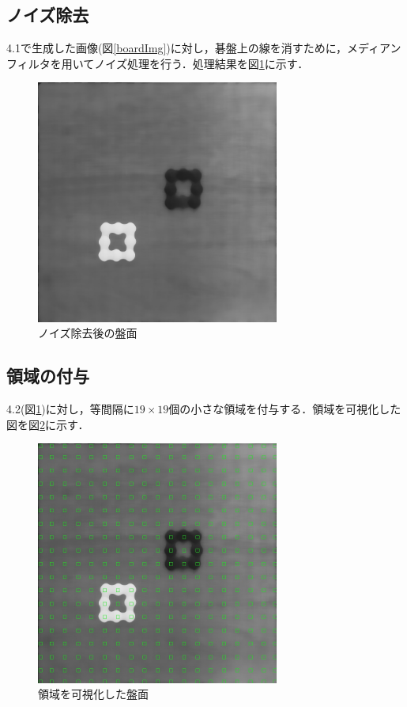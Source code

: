 \documentclass[openright]{nitocs}
\numberwithin{equation}{section}
\begin{document}
        \subsection{ノイズ除去}
            4.1で生成した画像(図\ref{boardImg})に対し，碁盤上の線を消すために，メディアンフィルタを用いてノイズ処理を行う．処理結果を図\ref{noiseReduced}に示す．
            \begin{figure}[tb] %
                \begin{center}
                \includegraphics[clip,width=80mm]{noiseReducedImg.jpg} 
                \caption{ノイズ除去後の盤面}
                \label{noiseReduced}
                \end{center}
            \end{figure}

        \subsection{領域の付与}
            \label{area}
            4.2(図\ref{noiseReduced})に対し，等間隔に$19\times19$個の小さな領域を付与する．領域を可視化した図を図\ref{boardWithArea}に示す．
            \begin{figure}[tb] %
                \begin{center}
                \includegraphics[clip,width=80mm]{boardWithAreaImg.jpg} 
                \caption{領域を可視化した盤面}
                \label{boardWithArea}
                \end{center}
            \end{figure}
\end{document}
